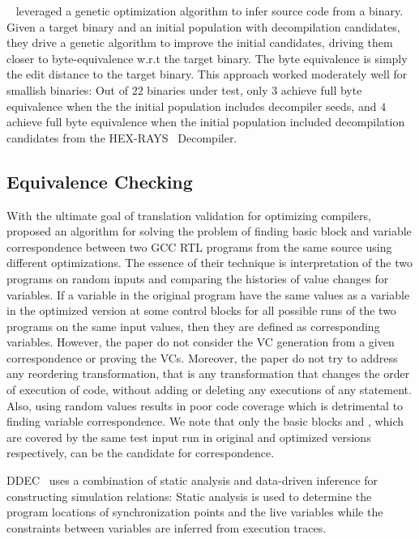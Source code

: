 ~\cite{eschulte2018bed} leveraged a genetic optimization algorithm to infer
source code from a binary. Given a target binary and an initial population with
decompilation candidates, they  drive a genetic algorithm to improve the
initial candidates, driving them closer to byte-equivalence w.r.t the target
binary. The byte equivalence  is simply the edit distance to the target binary.
This approach worked moderately well for smallish binaries: Out of $22$
binaries under test, only $3$ achieve full byte equivalence when the the
initial population includes decompiler seeds, and $4$ achieve full byte
equivalence when the initial population included decompilation candidates  from
the HEX-RAYS~\cite{hexray} Decompiler. 

\subsection{Equivalence Checking}

With the ultimate goal of translation validation for optimizing compilers,
     ~\cite{Iman2005} proposed an algorithm for solving the problem of finding
     basic block and variable correspondence between two GCC RTL programs from
     the same source using different optimizations.  The essence of their
     technique is interpretation of the two programs on random inputs and
     comparing the histories of value changes for variables. If a variable
      in the original program have the same values as a variable 
     in the optimized version at some control blocks for all possible runs of
     the two programs on the same input values, then they are defined as
     corresponding variables. However, the paper do not consider the VC
     generation from a given correspondence or proving the VCs. Moreover, the
     paper do not try to address any reordering transformation, that is any
     transformation that changes the order of execution of code, without adding
     or deleting any executions of any statement. Also, using random values
     results in poor code coverage which is detrimental to finding variable
     correspondence. We note that only the basic blocks  and ,
     which are covered by the same test input run in original and optimized
     versions respectively, can be the candidate for correspondence.     

DDEC~\cite{DDEC:OOPSLA:2013} uses a combination of static analysis and
data-driven inference for constructing simulation relations: Static analysis is
used to determine the program locations of synchronization points and the live
variables while the constraints between variables are inferred from execution
traces.

